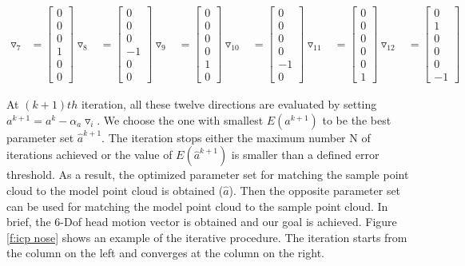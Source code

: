 \begin{equation}
\begin{aligned}
\triangledown_{7}&=\begin{bmatrix}0\\0\\0\\1\\0\\0\end{bmatrix}
\triangledown_{8}&=\begin{bmatrix}0\\0\\0\\-1\\0\\0\end{bmatrix}
\triangledown_{9}&=\begin{bmatrix}0\\0\\0\\0\\1\\0\end{bmatrix}
\triangledown_{10}&=\begin{bmatrix}0\\0\\0\\0\\-1\\0\end{bmatrix}
\triangledown_{11}&=\begin{bmatrix}0\\0\\0\\0\\0\\1\end{bmatrix}
\triangledown_{12}&=\begin{bmatrix}0\\1\\0\\0\\0\\-1\end{bmatrix}
\end{aligned}
\end{equation}


At $(k+1)th$ iteration, all these twelve directions are evaluated by setting $a^{k+1}=a^{k}-\alpha_{a}\triangledown_{i}$. We choose the one with smallest $E(a^{k+1})$ to be the best parameter set $\hat{a}^{k+1}$. The iteration stops either the maximum number N of iterations achieved or the value of $E(\hat a^{k+1})$ is smaller than a defined error threshold. As a result, the optimized parameter set for matching the sample point cloud to the model point cloud is obtained ($\hat a$). Then the opposite parameter set can be used for matching the model point cloud to the sample point cloud. In brief, the 6-Dof head motion vector is obtained and our goal is achieved. Figure \ref{f:icp nose} shows an example of the iterative procedure. The iteration starts from the column on the left and converges at the column on the right.

